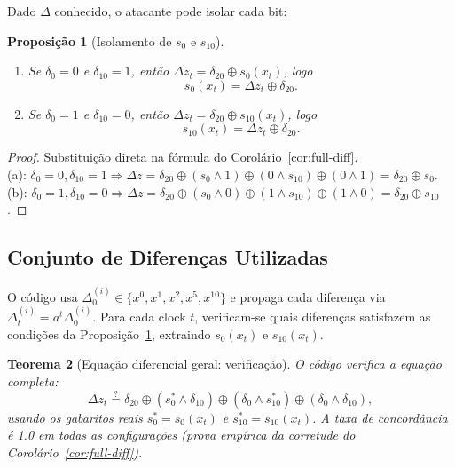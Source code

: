 \documentclass[12pt,a4paper]{article}
\newtheorem{theorem}{Teorema}[section]
\newtheorem{proposition}[theorem]{Proposição}
\theoremstyle{definition}
\theoremstyle{remark}
\newcommand{\xor}{\oplus}
\newcommand{\AND}{\wedge}
\newcommand{\ks}{z}
\begin{document}
Dado $\Delta$ conhecido, o atacante pode isolar cada bit:

\begin{proposition}[Isolamento de $s_0$ e $s_{10}$]
  \label{prop:isolation}
  \begin{enumerate}[label=(\alph*)]
    \item Se $\delta_0 = 0$ e $\delta_{10} = 1$, então
          $\Delta\ks_t = \delta_{20} \xor s_0(x_t)$, logo
          \[s_0(x_t) = \Delta\ks_t \xor \delta_{20}.\]

    \item Se $\delta_0 = 1$ e $\delta_{10} = 0$, então
          $\Delta\ks_t = \delta_{20} \xor s_{10}(x_t)$, logo
          \[s_{10}(x_t) = \Delta\ks_t \xor \delta_{20}.\]
  \end{enumerate}
\end{proposition}

\begin{proof}
  Substituição direta na fórmula do Corolário~\ref{cor:full-diff}. \\
  (a): $\delta_0=0, \delta_{10}=1 \Rightarrow \Delta\ks = \delta_{20} \xor
  (s_0 \AND 1) \xor (0 \AND s_{10}) \xor (0 \AND 1) = \delta_{20} \xor s_0$.\\
  (b): $\delta_0=1, \delta_{10}=0 \Rightarrow \Delta\ks = \delta_{20} \xor
  (s_0 \AND 0) \xor (1 \AND s_{10}) \xor (1 \AND 0) = \delta_{20} \xor s_{10}$. \qedhere
\end{proof}

\subsection{Conjunto de Diferenças Utilizadas}

O código usa $\Delta^{(i)}_0 \in \{x^0, x^1, x^2, x^5, x^{10}\}$ e
propaga cada diferença via $\Delta^{(i)}_t = a^t \Delta^{(i)}_0$.
Para cada clock $t$, verificam-se quais diferenças satisfazem as condições
da Proposição~\ref{prop:isolation}, extraindo $s_0(x_t)$ e $s_{10}(x_t)$.

\begin{theorem}[Equação diferencial geral: verificação]
  O código verifica a equação completa:
  \[
    \Delta\ks_t \stackrel{?}{=}
    \delta_{20} \xor (s_0^* \AND \delta_{10}) \xor (\delta_0 \AND s_{10}^*)
                \xor (\delta_0 \AND \delta_{10}),
  \]
  usando os gabaritos reais $s_0^* = s_0(x_t)$ e $s_{10}^* = s_{10}(x_t)$.
  A taxa de concordância é 1.0 em todas as configurações (prova empírica da
  corretude do Corolário~\ref{cor:full-diff}).
\end{theorem}
\end{document}
